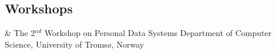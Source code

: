 \documentclass[11pt, a4paper]{article}
\newcommand{\Duration}[2]{\fontsize{10pt}{0}\selectfont #1--#2}
\newcommand{\Year}[1]{\fontsize{10pt}{0}\selectfont #1}
\begin{document}
\iffalse

\section*{Teaching}

All educational material developed for these courses is available at
\href{http://www.leoSharma.com/teaching}{leoSharma.com/teaching}

\subsection*{Undergraduate -- Universidade do Estado do Rio de Janeiro}

\begin{EntriesTable}
    \Duration{2014}{2016}  &
    Special Mathematics I: Introduction to Programming and Numerical Analysis
    \\
    \Duration{2014}{2016}  &
    Geophysics I: Gravity and magnetic methods
    \\
    \Duration{2014}{2016}  &
    Geophysics II: Exploration Seismology
    \\
    \Year{2015}  &
    Introduction to Geology
\end{EntriesTable}
\fi

\subsection*{Workshops} %

\begin{EntriesTable}
\Year{2017}  &
    The 2$^{nd}$ Workshop on Personal Data Systems
    \newline
    Department of Computer Science, University of Troms{\o},
    Norway
    \\
\end{EntriesTable}

\iffalse
\end{document}
